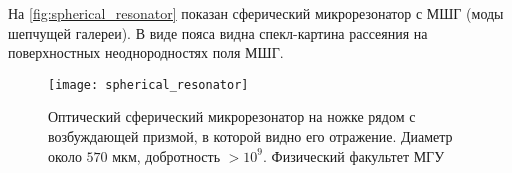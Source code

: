     На \autoref{fig:spherical_resonator} показан сферический микрорезонатор с МШГ (моды шепчущей галереи). В виде пояса видна спекл-картина рассеяния на поверхностных неоднородностях поля МШГ.
    \begin{figure}[h]
        \centering
        \texttt{[image: spherical\_resonator]}
        \caption[]{Оптический сферический микрорезонатор на ножке рядом с возбуждающей призмой, в которой видно его отражение. Диаметр около $570$ мкм, добротность $> 10^9$. Физический факультет МГУ \cite{microresonators}}
        \label{fig:spherical_resonator}
    \end{figure}
